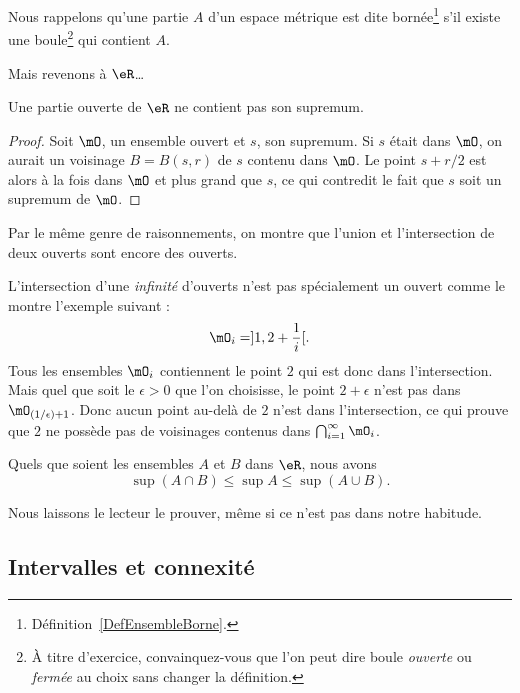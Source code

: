 Nous rappelons qu'une partie $A$ d'un espace métrique est dite bornée\footnote{Définition~\ref{DefEnsembleBorne}.} s'il existe une boule\footnote{À titre d'exercice, convainquez-vous que l'on peut dire boule \emph{ouverte} ou \emph{fermée} au choix sans changer la définition.} qui contient $A$.

Mais revenons à \( \eR \)\dots
\begin{lemma}  \label{LemSupOuvPas}
    Une partie ouverte de \( \eR\) ne contient pas son supremum.
\end{lemma}

\begin{proof}
Soit $\mO$, un ensemble ouvert et $s$, son supremum. Si $s$ était dans $\mO$, on aurait un voisinage $B=B(s,r)$ de $s$ contenu dans $\mO$. Le point $s+r/2$ est alors à la fois dans $\mO$ et plus grand que $s$, ce qui contredit le fait que $s$ soit un supremum de $\mO$.
\end{proof}

Par le même genre de raisonnements, on montre que l'union et l'intersection de deux ouverts sont encore des ouverts.

\begin{remark}
L'intersection d'une \emph{infinité} d'ouverts n'est pas spécialement un ouvert comme le montre l'exemple suivant :
\[
  \mO_i=]1,2+\frac{ 1 }{ i }[.
\]
Tous les ensembles $\mO_i$ contiennent le point $2$ qui est donc dans l'intersection. Mais quel que soit le $\epsilon>0$ que l'on choisisse, le point $2+\epsilon$ n'est pas dans $\mO_{(1/\epsilon)+1}$. Donc aucun point au-delà de $2$ n'est dans l'intersection, ce qui prouve que $2$ ne possède pas de voisinages contenus dans $\bigcap_{i=1}^{\infty}\mO_i$.
\end{remark}

\begin{proposition}     \label{PROPooANIOooIJHelX}
Quels que soient les ensembles $A$ et $B$ dans $\eR$, nous avons
\[
  \sup(A\cap B)\leq\sup A\leq\sup(A\cup B).
\]
\end{proposition}
Nous laissons le lecteur le prouver, même si ce n'est pas dans notre habitude.

\subsection{Intervalles et connexité}

